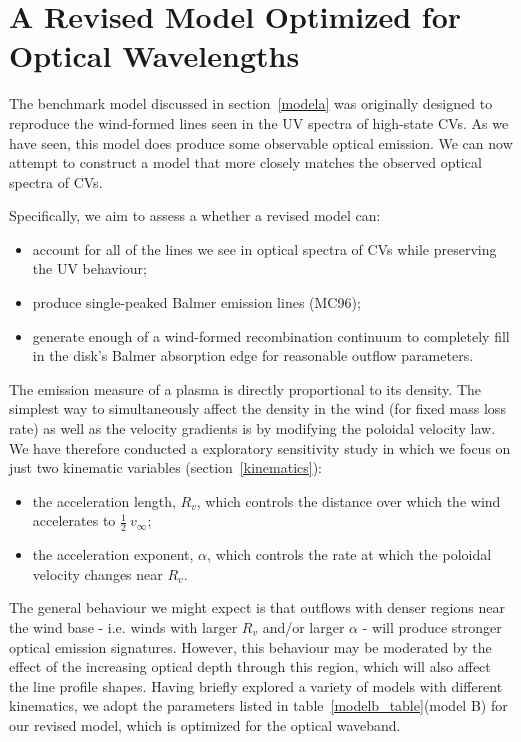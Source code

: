 \documentclass[preprint, a4paper, 11pt]{aastex}
\begin{document}
%
%

\section{A Revised Model Optimized for Optical Wavelengths}

The benchmark model discussed in section~\ref{modela} was originally
designed to reproduce the wind-formed lines seen in the UV spectra of
high-state CVs. As we have seen, this model does produce some observable
optical emission. We can now attempt to construct a model that more closely 
matches the observed optical spectra of CVs. 

Specifically, we aim to assess a whether a revised model can:

\begin{itemize}
         \item account for all of the lines we see in optical spectra of CVs while preserving
the UV behaviour;
         \item produce single-peaked Balmer emission lines (MC96); 
         \item generate enough of a wind-formed recombination continuum
to completely fill in the disk's Balmer absorption edge for 
reasonable outflow parameters.
\end{itemize} 

The emission measure of a plasma is directly proportional to its density.
The simplest way to simultaneously affect the density in the wind (for fixed mass loss rate)
as well as the velocity gradients is by modifying the poloidal velocity
law. We have therefore conducted a exploratory sensitivity study in
which we focus on just two kinematic variables (section~\ref{kinematics}):

\begin{itemize}
         \item the acceleration length, $R_v$, which controls the
        distance over which the wind accelerates to $\frac{1}{2}~v_{\infty}$;
         \item the acceleration exponent, $\alpha$, which controls the rate 
         at which the poloidal velocity changes near $R_v$.
\end{itemize} 

The general behaviour we might expect is that outflows with denser
regions near the wind base - i.e. winds with larger $R_{v}$ and/or
larger $\alpha$ - will produce stronger optical emission signatures. 
However, this behaviour may be moderated by the effect of the increasing
optical depth through this region, which will also affect the line profile shapes. 
Having briefly explored a variety of models with different kinematics,
we adopt the parameters listed in table~\ref{modelb_table}(model B) for our revised model,
which is optimized for the optical waveband.
\end{document}
